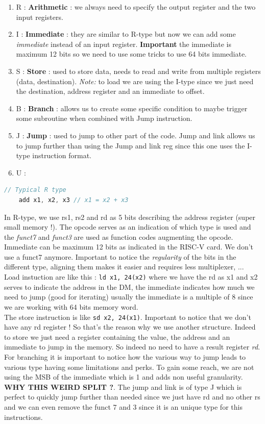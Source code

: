 \documentclass{report}
\begin{document}
\begin{enumerate}
    \item R : \textbf{Arithmetic} : we always need to specify the output register and the two input registers.
    \item I : \textbf{Immediate} : they are similar to R-type but now we can add some \textit{immediate} instead of an input register. \textbf{Important} the immediate is maximum 12 bits so we need to use some tricks to use 64 bits immediate.
    \item S : \textbf{Store} : used  to store data, needs to read and write from multiple registers (data, destination). \textit{Note:} to load we are using  the I-type since we just need the destination, address register and an immediate to offset.
    \item B : \textbf{Branch} : allows us to create some specific condition to maybe trigger some subroutine when combined with Jump instruction.
    \item J : \textbf{Jump} : used to jump to other part of the code. Jump and link allows us to jump further than using the Jump and link reg since this one uses the I-type instruction format.
    \item U :
\end{enumerate}

\begin{lstlisting}[language=C]
    // Typical R type
    add x1, x2, x3 // x1 = x2 + x3
\end{lstlisting}

In R-type, we use rs1, rs2 and rd as 5 bits describing the address register (super small memory !). The opcode serves as an indication of which type is used and the \textit{funct7} and \textit{funct3} are used as function codes augmenting the opcode.\\
Immediate can be maximum 12 bits as indicated in the RISC-V card. We don't use a funct7 anymore. Important to notice the \textit{regularity} of the bits in the different type, aligning them makes it easier and requires less multiplexer, ...\\
Load instuction are like this  : \verb|ld x1, 24(x2)| where we have the rd as x1 and x2 serves to indicate the address in the DM, the immediate indicates how much we need to jump (good for iterating) usually the immediate is a multiple of 8 since we are working with 64 bits memory word.\\
The store instruction is like \verb|sd x2, 24(x1)|. Important to notice that we don't have any rd register ! So that's the reason why we use another structure. Indeed to store we just need a register containing the value, the address and an immediate to jump in the memory. So indeed no need to have a result register \textit{rd}.\\
For branching it is important to notice how the various way to jump leads to various type having some limitations and perks. To gain some reach, we are not using the MSB of the immediate which is 1 and adds non useful granularity. \textbf{WHY THIS WEIRD SPLIT ?}. The jump and link is of type J which is perfect to quickly jump further than needed since we just have rd and no other rs and we can even remove the funct 7 and 3 since it is an unique type for this instructions.
\end{document}
